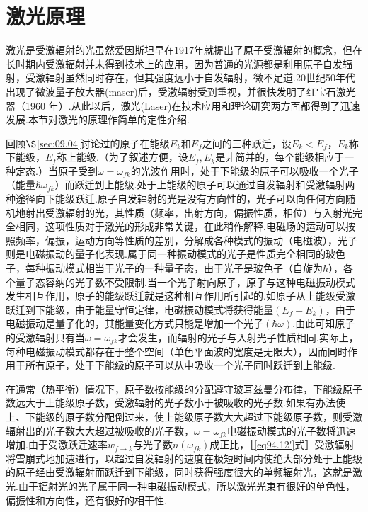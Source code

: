 \starthis\section[激光原理]{激光原理} \label{sec:09.05} %

激光是受激辐射的光虽然爱因斯坦早在1917年就提出了原子受激辐射的概念，但在长时期内受激辐射并未得到技术上的应用，因为普通的光源都是利用原子自发辐射，受激辐射虽然同时存在，但其强度远小于自发辐射，微不足道.20世纪50年代出现了微波量子放大器(maser)后，受激辐射受到重视，并很快发明了红宝石激光器（1960 年）.从此以后，激光(Laser)在技术应用和理论研究两方面都得到了迅速发展.本节对激光的原理作简单的定性介绍.

回顾$\S$\ref{sec:09.04}讨论过的原子在能级$E_{k}$和$E_{f}$之间的三种跃迁，设$E_{k}<E_{f}$，$E_{k}$称下能级，$E_{f}$称上能级.（为了叙述方便，设$E_{f},E_{k}$是非简并的，每个能级相应于一种定态.）当原子受到$\omega=\omega_{fk}$的光波作用时，处于下能级的原子可以吸收一个光子（能量$\hbar\omega_{fk}$）而跃迁到上能级.处于上能级的原子可以通过自发辐射和受激辐射两种途径向下能级跃迁.原子自发辐射的光是没有方向性的，光子可以向任何方向随机地射出受激辐射的光，其性质（频率，出射方向，偏振性质，相位）与入射光完全相同，这项性质对于激光的形成非常关键，在此稍作解释.电磁场的运动可以按照频率，偏振，运动方向等性质的差别，分解成各种模式的振动（电磁波），光子则是电磁振动的量子化表现.属于同一种振动模式的光子是性质完全相同的玻色子，每种振动模式相当于光子的一种量子态，由于光子是玻色子（自旋为$\hbar$），各个量子态容纳的光子数不受限制.当一个光子射向原子，原子与这种电磁振动模式发生相互作用，原子的能级跃迁就是这种相互作用所引起的.如原子从上能级受激跃迁到下能级，由于能量守恒定律，电磁振动模式将获得能量$(E_{f}-E_{k})$，由于电磁振动是量子化的，其能量变化方式只能是增加一个光子$(\hbar\omega)$.由此可知原子的受激辐射只有当$\omega=\omega_{fk}$才会发生，而辐射的光子与入射光子性质相同.实际上，每种电磁振动模式都存在于整个空间（单色平面波的宽度是无限大），因而同时作用于所有原子，处于下能级的原子可以从中吸收一个光子同时跃迁到上能级.

在通常（热平衡）情况下，原子数按能级的分配遵守玻耳兹曼分布律，下能级原子数远大于上能级原子数，受激辐射的光子数小于被吸收的光子数.如果有办法使上、下能级的原子数分配倒过来，使上能级原子数大大超过下能级原子数，则受激辐射出的光子数大大超过被吸收的光子数，$\omega=\omega_{fk}$电磁振动模式的光子数将迅速增加.由于受激跃迁速率$w_{f\rightarrow k}$与光子数$n(\omega_{fk})$成正比，［\eqref{eq94.12'}式］受激辐射将雪崩式地加速进行，以超过自发辐射的速度在极短时间内使绝大部分处于上能级的原子经由受激辐射而跃迁到下能级，同时获得强度很大的单频辐射光，这就是激光.由于辐射光的光子属于同一种电磁振动模式，所以激光光束有很好的单色性，偏振性和方向性，还有很好的相干性.

